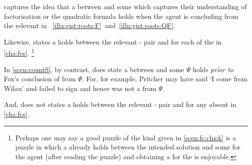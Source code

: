 \begin{note}
  \supportII{} captures the idea that a \ros{} between  and some \pool{} which captures their understanding of factorisation or the quadratic formula holds when the agent is concluding  from the relevant \pool{} in ~\ref{illu:gist:roots:F}~and~\ref{illu:gist:roots:QF}.

  Likewise, \supportII{} states a \ros{} holds between the relevant - pair and \pool{} for each of the  in \autoref{cha:fcs}.%
  \footnote{
    Perhaps one may say a good puzzle of the kind given in \autoref{scen:fc:chick} is a puzzle in which a \ros{} already holds between the intended solution and some \pool{} for the agent (after reading the puzzle) and obtaining a \wit{} for the \ros{} is enjoyable.
  }

  In \autoref{scen:countS}, by contrast, \supportII{} does state a \ros{} between  and some \pool{} \(\Psi\) holds \emph{prior to} Fox's conclusion of  from \(\Psi\).
  For, for example, Pritcher may have said `I come from Wilau' and failed to sign and hence  was not a \fc{} from \(\Psi\).

  And, \supportII{} does not states a \ros{} holds between the relevant - pair and \pool{} for any absent  in \autoref{cha:fcs}.
\end{note}


